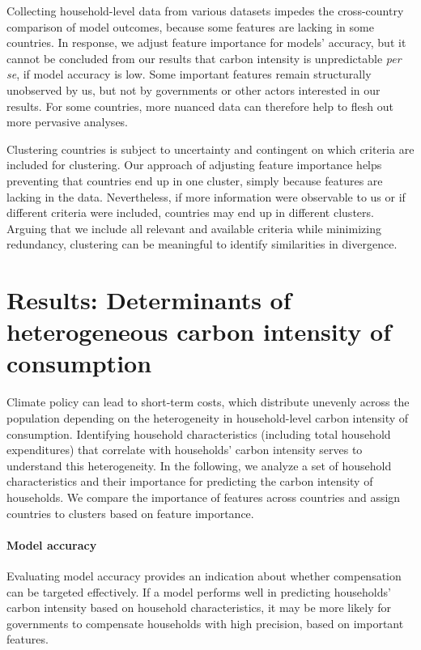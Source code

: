 \documentclass[12pt, a4paper]{article}
\begin{document}
Collecting household-level data from various datasets impedes the cross-country comparison of model outcomes, because some features are lacking in some countries. In response, we adjust feature importance for models' accuracy, but it cannot be concluded from our results that carbon intensity is unpredictable \textit{per se}, if model accuracy is low. Some important features remain structurally unobserved by us, but not by governments or other actors interested in our results. For some countries, more nuanced data can therefore help to flesh out more pervasive analyses.

Clustering countries is subject to uncertainty and contingent on which criteria are included for clustering. Our approach of adjusting feature importance helps preventing that countries end up in one cluster, simply because features are lacking in the data. Nevertheless, if more information were observable to us or if different criteria were included, countries may end up in different clusters. Arguing that we include all relevant and available criteria while minimizing redundancy, clustering can be meaningful to identify similarities in divergence.

\section{Results: Determinants of heterogeneous carbon intensity of consumption} \label{sec:results}

Climate policy can lead to short-term costs, which distribute unevenly across the population depending on the heterogeneity in household-level carbon intensity of consumption. Identifying household characteristics (including total household expenditures) that correlate with households' carbon intensity serves to understand this heterogeneity. In the following, we analyze a set of household characteristics and their importance for predicting the carbon intensity of households. We compare the importance of features across countries and assign countries to clusters based on feature importance.

\paragraph{Model accuracy} 
Evaluating model accuracy provides an indication about whether compensation can be targeted effectively. If a model performs well in predicting households' carbon intensity based on household characteristics, it may be more likely for governments to compensate households with high precision, based on important features. 
\end{document}

